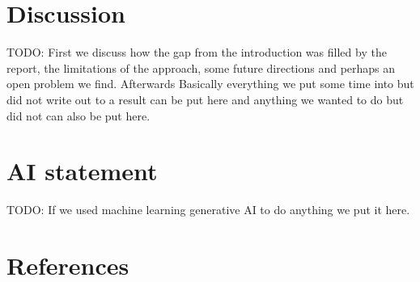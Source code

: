 \documentclass[conference]{IEEEtran}
\begin{document}
\section{Discussion}
TODO: First we discuss how the gap from the introduction was filled by the report, the limitations
of the approach, some future directions and perhaps an open problem we find. Afterwards Basically 
everything we put some time into but did not write out to a result can be put here and anything we 
wanted to do but did not can also be put here.

\section*{AI statement}
TODO: If we used machine learning generative AI to do anything we put it here.

\section*{References}
\end{document}
